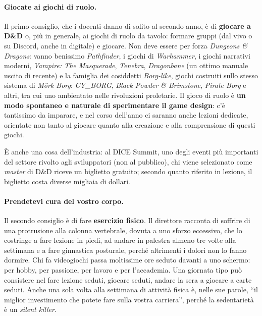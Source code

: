 \paragraph{Giocate ai giochi di ruolo.} Il primo consiglio, che i docenti
danno di solito al secondo anno, è di \textbf{giocare a D\&D} o, più in
generale, ai giochi di ruolo da tavolo: formare gruppi (dal vivo o su Discord,
anche in digitale) e giocare. Non deve essere per forza \emph{Dungeons \&
Dragons}: vanno benissimo \emph{Pathfinder}, i giochi di \emph{Warhammer}, i
giochi narrativi moderni, \emph{Vampire: The Masquerade}, \emph{Tenebra},
\emph{Dragonbane} (un ottimo manuale uscito di recente) e la famiglia dei
cosiddetti \emph{Borg-like}, giochi costruiti sullo stesso sistema di
\emph{Mörk Borg}: \emph{CY\_BORG}, \emph{Black Powder \& Brimstone},
\emph{Pirate Borg} e altri, tra cui uno ambientato nelle rivoluzioni
proletarie. Il gioco di ruolo è \textbf{un modo spontaneo e naturale di
sperimentare il game design}: c'è tantissimo da imparare, e nel corso
dell'anno ci saranno anche lezioni dedicate, orientate non tanto al giocare
quanto alla creazione e alla comprensione di questi giochi.

È anche una cosa dell'industria: al DICE Summit, uno degli eventi più
importanti del settore rivolto agli sviluppatori (non al pubblico), chi viene
selezionato come \emph{master} di D\&D riceve un biglietto gratuito; secondo
quanto riferito in lezione, il biglietto costa diverse migliaia di dollari.

\paragraph{Prendetevi cura del vostro corpo.} Il secondo consiglio è di fare
\textbf{esercizio fisico}. Il direttore racconta di soffrire di una
protrusione alla colonna vertebrale, dovuta a uno sforzo eccessivo, che lo
costringe a fare lezione in piedi, ad andare in palestra almeno tre volte alla
settimana e a fare ginnastica posturale, perché altrimenti i dolori non lo
fanno dormire. Chi fa videogiochi passa moltissime ore seduto davanti a uno
schermo: per hobby, per passione, per lavoro e per l'accademia. Una giornata
tipo può consistere nel fare lezione seduti, giocare seduti, andare la sera a
giocare a carte seduti. Anche una sola volta alla settimana di attività fisica
è, nelle sue parole, ``il miglior investimento che potete fare sulla vostra
carriera'', perché la sedentarietà è un \emph{silent killer}.

